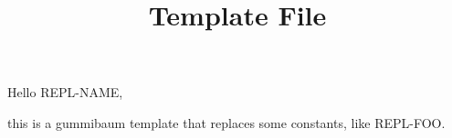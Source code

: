 \documentclass[a4paper]{scrartcl}
\title{Template File}
\begin{document}
\maketitle

Hello REPL-NAME,

this is a gummibaum template that replaces some constants, like REPL-FOO.
\end{document}
